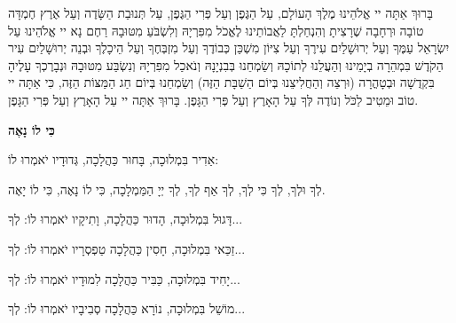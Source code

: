 \vspace{0.5em}


\vspace{0.5em}

בָּרוּךְ אַתָּה יי אֱלֹהֵינוּ מֶלֶךְ הָעוֹלָם, עַל הַגֶּפֶן וְעַל פְּרִי הַגֶּפֶן, עַל תְּנוּבַת הַשָּׂדֶה וְעַל אֶרֶץ חֶמְדָּה טוֹבָה וּרְחָבָה שֶׁרָצִיתָ וְהִנְחַלְתָּ לַאֲבוֹתֵינוּ לֶאֱכֹל מִפִּרְיָהּ וְלִשְׂבֹּעַ מִטּוּבָהּ רַחֶם נָא יי אֱלֹהֵינוּ עַל יִשְׂרָאֵל עַמֶּךָ וְעַל יְרוּשָׁלַיִם עִירֶךָ וְעַל צִיּוֹן מִשְׁכַּן כְּבוֹדֶךָ וְעַל מִזְבְּחֶךָ וְעַל הֵיכָלֶךָ וּבְנֵה יְרוּשָׁלַיִם עִיר הַקֹדֶשׁ בִּמְהֵרָה בְיָמֵינוּ וְהַעֲלֵנוּ לְתוֹכָהּ וְשַׂמְחֵנוּ בְּבִנְיָנָהּ וְנֹאכַל מִפִּרְיָהּ וְנִשְׂבַּע מִטּוּבָהּ וּנְבָרֶכְךָ עָלֶיהָ בִּקְדֻשָׁה וּבְטָהֳרָה (וּרְצֵה וְהַחֲלִיצֵנוּ בְּיוֹם הַשַׁבָּת הַזֶּה) וְשַׂמְחֵנוּ בְּיוֹם חַג הַמַּצּוֹת הַזֶּה, כִּי אַתָּה יי טוֹב וּמֵטִיב לַכֹּל וְנוֹדֶה לְּךָ עַל הָאָרֶץ וְעַל פְּרִי הַגָּפֶן. בָּרוּךְ אַתָּה יי עַל הָאָרֶץ וְעַל פְּרִי הַגָּפֶן.


\setlength{\parindent}{0em}

\vspace{-1em}
\begin{center}
{\large \bfseries \textcolor{light-gray}{
כִּי לוֹ נָאֶה
}}
\end{center}
\vspace{-0.5em}


אַדִיר בִּמְלוּכָה, בָּחוּר כַּהֲלָכָה, גְּדוּדָיו יֹאמְרוּ לוֹ: 

\vspace{0.5em}

\hfill
לְךָ וּלְךָ, 
לְךָ כִּי לְךָ, 
לְךָ אַף לְךָ, 
לְךָ יְיָ הַמַּמְלָכָה, 
כִּי לוֹ נָאֶה, כִּי לוֹ יָאֶה.

\vspace{0.5em}

דָּגוּל בִּמְלוּכָה, הָדוּר כַּהֲלָכָה, וָתִיקָיו יֹאמְרוּ לוֹ: 
\hfill
לְךָ...

זַכַּאי בִּמְלוּכָה, חָסִין כַּהֲלָכָה טַפְסְרָיו יֹאמְרוּ לוֹ: 
\hfill
לְךָ...

יָחִיד בִּמְלוּכָה, כַּבִּיר כַּהֲלָכָה לִמוּדָיו יֹאמְרוּ לוֹ: 
\hfill
לְךָ...

מוֹשֵׁל בִּמְלוּכָה, נוֹרָא כַּהֲלָכָה סְבִיבָיו יֹאמְרוּ לוֹ: 
\hfill
לְךָ...

